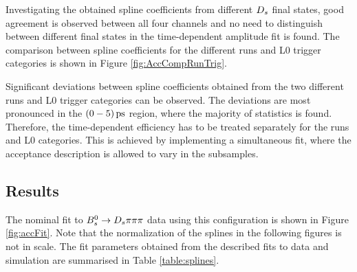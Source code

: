 Investigating the obtained spline coefficients from different ${{D}_{s}}$ final states, 
good agreement is observed between all four channels and no need to distinguish between different final states in the time-dependent amplitude fit is found. \newline
The comparison between spline coefficients for the different runs and L0 trigger categories is shown in Figure \ref{fig:AccCompRunTrig}.

Significant deviations between spline coefficients obtained from the two different runs and L0 trigger categories can be observed. 
The deviations are most pronounced in the $(0-5) {\mathrm{ \,ps}}$ region, where the majority of statistics is found. 
Therefore, the time-dependent efficiency has to be treated separately for the runs and L0 categories. 
This is achieved by implementing a simultaneous fit, where the acceptance description is allowed to vary in the subsamples.   

\clearpage
\subsection{Results}

The nominal fit to ${{B}^0_{s}}\rightarrow{\ensuremath{{D}_{s}}}{\ensuremath{\pi}}{\ensuremath{\pi}}{\ensuremath{\pi}}$ data using this configuration is shown in Figure \ref{fig:accFit}. 
Note that the normalization of the splines in the following figures is not in scale.
The fit parameters obtained from the described fits to data and simulation are summarised in Table \ref{table:splines}.

